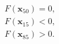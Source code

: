 $\begin{array}{r}
    F\left( \mathbf{x}_{50} \right) =0,\\
    F\left( \mathbf{x}_{15} \right) <0,\\
    F\left( \mathbf{x}_{85} \right) >0.
    \end{array}$